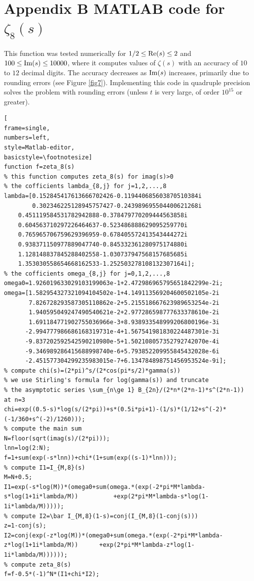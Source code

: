 \documentclass[12pt]{article}
\def\re{\textnormal {Re}}
\def\im{\textnormal {Im}}
\theoremstyle{definition}
\begin{document}
\section*{Appendix B  \hspace{0.5cm} MATLAB code for $\zeta_8(s)$}\label{AppendixB}
 This function was tested  numerically for $1/2\le \re(s)\le 2$ and $100\le \im(s)\le 10000$, where it computes values of $\zeta(s)$ with an accuracy of $10$ to $12$ decimal digits. The accuracy decreases as $\im(s)$ increases, primarily due to rounding errors (see Figure \ref{fig7}). Implementing this code in quadruple precision solves the problem with rounding errors (unless $t$ is very large, of order $10^{15}$ or greater).  
   \begin{lstlisting}[
frame=single,
numbers=left,
style=Matlab-editor,
basicstyle=\footnotesize]
function f=zeta_8(s)
% this function computes zeta_8(s) for imag(s)>0
% the cofficients lambda_{8,j} for j=1,2,...,8
lambda=[0.152845417613666702426-0.119440685603870510384i
        0.302346225128945757427-0.243989695504400621268i          
	0.451119584531782942888-0.378479770209444563858i 
	0.604563710297226464637-0.523486888629095259770i
	0.765965706759629396959-0.678405572413543444272i
	0.938371150977889047740-0.845332361280975174880i
	1.128148837845288402558-1.030737947568157685685i
	1.353030558654668162533-1.252503278108132307164i];    
% the cofficients omega_{8,j} for j=0,1,2,...,8	           
omega0=1.926019633029103199063e-1+2.472986965795651842299e-2i;
omega=[1.582954327321094104502e-1+4.149113569204600502105e-2i   
       7.826728293587305110862e-2+5.215518667623989653254e-2i   
       1.940595049247490540621e-2+2.977286598777633378610e-2i  
       1.691184771902755036966e-3+8.938933548999206800196e-3i     
      -2.994777986686168319731e-4+1.567541981830224487301e-3i   
      -9.837202592542590210980e-5+1.502108057352792742070e-4i  
      -9.346989286415688998740e-6+5.793852209955845432028e-6i  
      -2.451577304299235983015e-7+6.134784898751456953524e-9i];  
% compute chi(s)=(2*pi)^s/(2*cos(pi*s/2)*gamma(s))
% we use Stirling's formula for log(gamma(s)) and truncate
% the asymptotic series \sum_{n\ge 1} B_{2n}/(2*n*(2*n-1)*s^(2*n-1)) at n=3
chi=exp((0.5-s)*log(s/(2*pi))+s*(0.5i*pi+1)-(1/s)*(1/12+s^(-2)*(-1/360+s^(-2)/1260)));
% compute the main sum
N=floor(sqrt(imag(s)/(2*pi)));
lnn=log(2:N); 
f=1+sum(exp(-s*lnn))+chi*(1+sum(exp((s-1)*lnn)));   
% compute I1=I_{M,8}(s) 
M=N+0.5;
I1=exp(-s*log(M))*(omega0+sum(omega.*(exp(-2*pi*M*lambda-s*log(1+1i*lambda/M))          +exp(2*pi*M*lambda-s*log(1-1i*lambda/M)))));  
% compute I2=\bar I_{M,8}(1-s)=conj(I_{M,8}(1-conj(s)))
z=1-conj(s); 
I2=conj(exp(-z*log(M))*(omega0+sum(omega.*(exp(-2*pi*M*lambda-z*log(1+1i*lambda/M))      +exp(2*pi*M*lambda-z*log(1-1i*lambda/M))))));
% compute zeta_8(s)
f=f-0.5*(-1)^N*(I1+chi*I2); 



   \end{lstlisting}   


\end{document}

